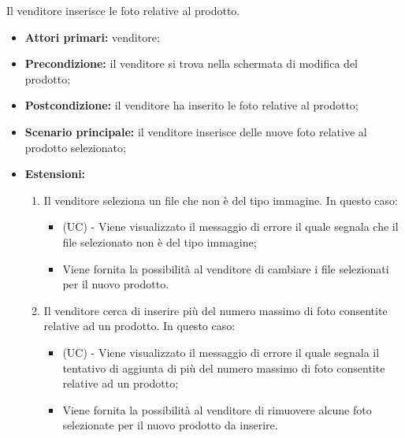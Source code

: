 Il venditore inserisce le foto relative al prodotto.
\begin{itemize}
    \item \textbf{Attori primari:} venditore;
    \item \textbf{Precondizione:} il venditore si trova nella schermata di modifica del prodotto;
    \item \textbf{Postcondizione:} il venditore ha inserito le foto relative al prodotto;
    \item \textbf{Scenario principale:} il venditore inserisce delle nuove foto relative al prodotto selezionato;
    \item \textbf{Estensioni:}
    \begin{enumerate}[label=\lett]
    	\item Il venditore seleziona un file che non è del tipo immagine. In questo caso:
		\begin{itemize}
			\item (UC) - Viene visualizzato il messaggio di errore il quale segnala che il file selezionato non è del tipo immagine;
			\item Viene fornita la possibilità al venditore di cambiare i file selezionati per il nuovo prodotto.
		\end{itemize}
		\item Il venditore cerca di inserire più del numero massimo di foto consentite relative ad un prodotto. In questo caso:
		\begin{itemize}
			\item (UC) - Viene visualizzato il messaggio di errore il quale segnala il tentativo di aggiunta di più del numero massimo di foto consentite relative ad un prodotto;
			\item Viene fornita la possibilità al venditore di rimuovere alcune foto selezionate per il nuovo prodotto da inserire.
		\end{itemize}
    \end{enumerate}
\end{itemize}

